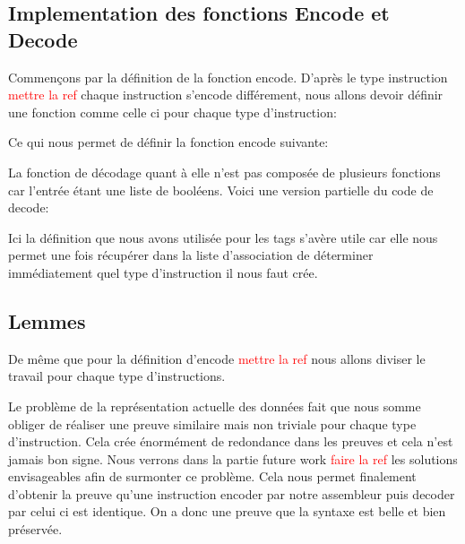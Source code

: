 \documentclass {article}
\newcommand{\codefrom}[3]
           {}
\theoremstyle{definition}
\theoremstyle{remark}
\newcommand{\todo}[1]{\textcolor{red}{#1}}
\begin{document}
\codefrom{src}{encode}{notation}






\subsection{Implementation des fonctions Encode et Decode}

Commençons par la définition de la fonction encode. D'après le type instruction \todo{mettre la ref}
chaque instruction s'encode différement, nous allons devoir définir une fonction comme celle ci
pour chaque type d'instruction:

\codefrom{src}{encode}{encode_t_n}

Ce qui nous permet de définir la fonction encode suivante:

\codefrom{src}{encode}{encode}

La fonction de décodage quant à elle n'est pas composée de plusieurs fonctions car l'entrée
étant une liste de booléens.
Voici une version partielle du code de decode:

\codefrom{src}{encode}{decode}

Ici la définition que nous avons utilisée pour les tags s'avère utile car elle nous permet
une fois récupérer dans la liste d'association de déterminer immédiatement quel type
d'instruction il nous faut crée.





\subsection{Lemmes}

De même que pour la définition d'encode \todo{mettre la ref} nous allons diviser le travail pour chaque
type d'instructions.

\codefrom{src}{encodeProof}{encode_decode_t_n}

Le problème de la représentation actuelle des données fait que nous somme obliger de réaliser une preuve
similaire mais non triviale pour chaque type d'instruction. Cela crée énormément de redondance dans les preuves
et cela n'est jamais bon signe. Nous verrons dans la partie future work \todo{faire la ref} les solutions envisageables afin
de surmonter ce problème.
Cela nous permet finalement d'obtenir la preuve qu'une instruction encoder par notre assembleur puis decoder par celui
ci est identique. On a donc une preuve que la syntaxe est belle et bien préservée.
\end{document}
